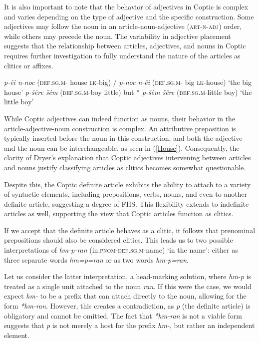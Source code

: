 \documentclass[output=paper,colorlinks,citecolor=brown ,chinesefont]{langscibook}
\begin{document}
It is also important to note that the behavior of adjectives in Coptic is complex and varies depending on the type of adjective and the specific construction. Some adjectives may follow the noun in an article-noun-adjective (\textsc{art-n-adj}) order, while others may precede the noun. The variability in adjective placement suggests that the relationship between articles, adjectives, and nouns in Coptic requires further investigation to fully understand the nature of the articles as clitics or affixes.

\begin{exe}

        \ex	{} \textit{p-êi n-noc} (\textsc{def}.\textsc{sg}.\textsc{m}- house \textsc{lk}-big) /  \textit{p-noc n-êi} (\textsc{def}.\textsc{sg}.\textsc{m}- big \textsc{lk}-house) ‘the big house' \label{House}
        \ex {} \textit{p-šêre šêm}  (\textsc{def}.\textsc{sg}.\textsc{m}-boy little) but * \textit{p-šêm šêre} (\textsc{def}.\textsc{sg}.\textsc{m}-little boy) ‘the little boy' \label{boy}

\end{exe}

While Coptic adjectives can indeed function as nouns, their behavior in the article-adjective-noun  construction is complex. An attributive preposition is typically inserted before the noun in this construction, and both the adjective and the noun can be interchangeable, as seen in (\ref{House}). Consequently, the clarity of Dryer's explanation that Coptic adjectives intervening between articles and nouns justify classifying articles as clitics becomes somewhat questionable.

Despite this, the Coptic definite article exhibits the ability to attach to a variety of syntactic elements, including prepositions, verbs, nouns, and even to another definite article, suggesting a degree of FHS. This flexibility extends to indefinite articles as well, supporting the view that Coptic articles function as clitics.

If we accept that the definite article behaves as a clitic, it follows that prenominal prepositions should also be considered clitics. This leads us to two possible interpretations of  \textit{hm-p-ran} (in.\textsc{pnom}-\textsc{def}.\textsc{sg}.\textsc{m}-name) ‘in the name': either as three separate words \textit{hm=p=ran} or as two words \textit{hm-p=ran}.

Let us consider the latter interpretation, a head-marking solution, where  \textit{hm-p} is treated as a single unit attached to the noun  \textit{ran}. If this were the case, we would expect  \textit{hm-} to be a prefix that can attach directly to the noun, allowing for the form  \textit{*hm-ran}. However, this creates a contradiction, as  \textit{p} (the definite article) is obligatory and cannot be omitted. The fact that  \textit{*hm-ran} is not a viable form suggests that  
 \textit{p} is not merely a host for the prefix \textit{hm-}, but rather an independent element.
\end{document}
